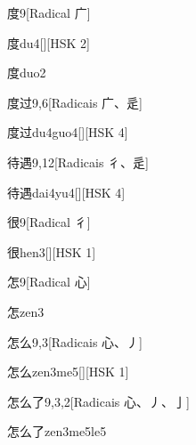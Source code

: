 \begin{entry}{度}{9}[Radical ⼴]
  \begin{phonetics}{度}{du4}[][HSK 2]
  \end{phonetics}
  \begin{phonetics}{度}{duo2}
  \end{phonetics}
\end{entry}

\begin{entry}{度过}{9,6}[Radicais ⼴、⾡]
  \begin{phonetics}{度过}{du4guo4}[][HSK 4]
  \end{phonetics}
\end{entry}

\begin{entry}{待遇}{9,12}[Radicais ⼻、⾡]
  \begin{phonetics}{待遇}{dai4yu4}[][HSK 4]
  \end{phonetics}
\end{entry}

\begin{entry}{很}{9}[Radical ⼻]
  \begin{phonetics}{很}{hen3}[][HSK 1]
  \end{phonetics}
\end{entry}

\begin{entry}{怎}{9}[Radical ⼼]
  \begin{phonetics}{怎}{zen3}
  \end{phonetics}
\end{entry}

\begin{entry}{怎么}{9,3}[Radicais ⼼、⼃]
  \begin{phonetics}{怎么}{zen3me5}[][HSK 1]
  \end{phonetics}
\end{entry}

\begin{entry}{怎么了}{9,3,2}[Radicais ⼼、⼃、⼅]
  \begin{phonetics}{怎么了}{zen3me5le5}
  \end{phonetics}
\end{entry}

